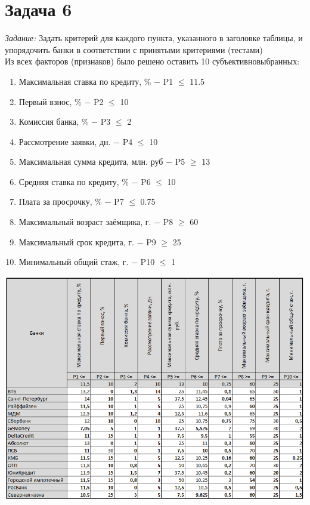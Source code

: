 \documentclass[14pt,fleqn]{extarticle}
\begin{document}
	\section*{Задача 6}
	\textit{Задание:} Задать критерий для каждого пункта, указанного в заголовке таблицы, и упорядочить банки в соответствии с принятыми критериями (тестами)\\
	
	Из всех факторов (признаков) было решено оставить 10 субъективновыбранных:
	\begin{enumerate}
		\item Максимальная ставка по кредиту, \% $-$ P1 $\leq$ 11.5
		\item Первый взнос, \% $-$ P2 $\leq$ 10
		\item Комиссия банка, \% $-$ P3 $\leq$ 2
		\item Рассмотрение заявки, дн. $-$ P4 $\leq$ 10
		\item Максимальная сумма кредита, млн. руб $-$ P5 $\geq$ 13
		\item Средняя ставка по кредиту, \% $-$ P6 $\leq$ 10
		\item Плата за просрочку, \% $-$ P7 $\leq$ 0.75
		\item Максимальный возраст заёмщика, г. $-$ P8 $\geq$ 60
		\item Максимальный срок кредита, г. $-$ P9 $\geq$ 25
		\item Минимальный общий стаж, г. $-$ P10 $\leq$ 1
	\end{enumerate}
	\newpage
	\begin{center}
		\includegraphics[scale=0.84]{1}
	\end{center}
\end{document}
